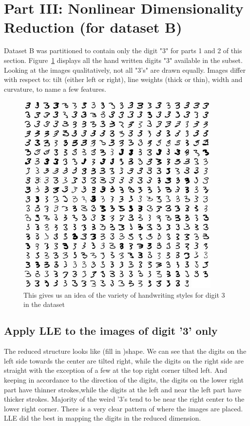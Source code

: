 \section{Part III: Nonlinear Dimensionality Reduction (for dataset B)}

Dataset B was partitioned to contain only the digit "3" for parts 1 and 2 of this section. Figure~\ref{fig:fig8} displays all the hand written digits "3" available in the subset. Looking at the images qualitatively, not all "3's" are drawn equally. Images differ with respect to: tilt (either left or right), line weights (thick or thin), width and curvature, to name a few features. 
\begin{figure}[htb]
 \centering
\includegraphics[width=4in]{assignment1/3-0-alldigit3.png}
\caption{\label{fig:fig8}This gives us an idea of the variety of handwriting styles for digit 3 in the dataset}
\end{figure}


\clearpage{}
\subsection{Apply LLE to the images of digit '3' only}
 The reduced structure looks like (fill in )shape. We can see that the digits on the left side towards the center are tilted right, while the digits on the right side are straight with the exception of a few at the top right corner tilted left. And keeping in accordance to the direction of the digits, the digits on the lower right part  have thinner strokes,while the digits at the left and  near the left part  have thicker strokes. Majority of the weird '3's  tend to be near the right center to the lower right  corner. There is a very clear pattern of where the images are placed. 
 LLE did the best in mapping the digits in the reduced dimension.


